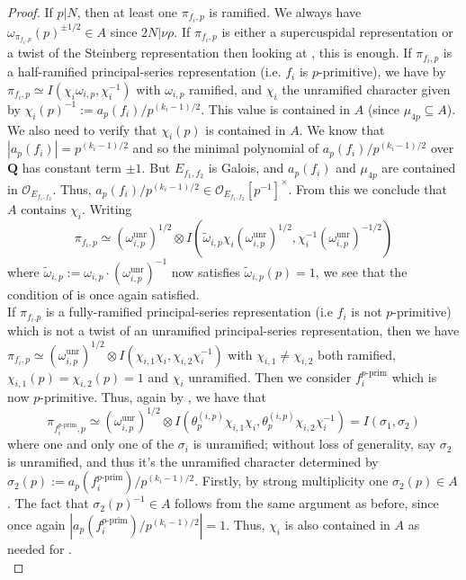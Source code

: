 \documentclass{amsart}
\theoremstyle{plain}
\theoremstyle{plain}
\theoremstyle{remark}
\begin{document}
\begin{proof}
    If $p|N$, then at least one $\pi_{f_i,p}$ is ramified. We always have $\omega_{\pi_{f_i,p}}(p)^{\pm 1/2}\in A$ since $2N|\nu\rho.$ If $\pi_{f_i,p}$ is either a supercuspidal representation or a twist of the Steinberg representation then looking at , this is enough. If $\pi_{f_i,p}$ is a half-ramified principal-series representation (i.e. $f_i$ is $p$-primitive), we have by \cite[Proposition $2.8$]{loeffler2012computation} $\pi_{f_i,p}\simeq I(\chi_{i}\omega_{i,p},\chi_{i}^{-1})$ with $\omega_{i,p}$ ramified, and $\chi_{i}$ the unramified character given by $\chi_{i}(p)^{-1}:=a_p(f_i)/p^{(k_i-1)/2}.$ This value is contained in $A$ (since $\mu_{4p}\subseteq A$). We also need to verify that $\chi_{i}(p)$ is contained in $A$. We know that $|a_p(f_i)|=p^{(k_i-1)/2}$ and so the minimal polynomial of $a_p(f_i)/p^{(k_i-1)/2}$ over $\mathbf{Q}$ has constant term $\pm 1$. But $E_{f_1,f_2}$ is Galois, and $a_p(f_i)$ and $\mu_{4p}$ are contained in $\mathcal{O}_{E_{f_1,f_2}}$. Thus, $a_p(f_i)/p^{(k_i-1)/2}\in\mathcal{O}_{E_{f_1,f_2}}[p^{-1}]^\times$. From this we conclude that $A$ contains $\chi_{i}$. Writing 
    $$\pi_{f_i,p}\simeq (\omega_{i,p}^\mathrm{unr})^{1/2}\otimes I\left(\tilde\omega_{i,p}\chi_{i} (\omega_{i,p}^\mathrm{unr})^{1/2},\chi_{i}^{-1}(\omega_{i,p}^\mathrm{unr})^{-1/2}\right)$$
    where $\tilde\omega_{i,p}:=\omega_{i,p} \cdot(\omega_{i,p}^\mathrm{unr})^{-1}$ now satisfies $\tilde\omega_{i,p}(p)=1$, we see that the condition of  is once again satisfied.\\
    If $\pi_{f_i.p}$ is a fully-ramified principal-series representation (i.e $f_i$ is not $p$-primitive) which is not a twist of an unramified principal-series representation, then we have $\pi_{f_i,p}\simeq (\omega_{i,p}^\mathrm{unr})^{1/2}\otimes I(\chi_{i,1}\chi_i,\chi_{i,2}\chi_i^{-1})$ with $\chi_{i,1}\neq\chi_{i,2}$ both ramified, $\chi_{i,1}(p)=\chi_{i,2}(p)=1$ and $\chi_i$ unramified. Then we consider $f_i^{p\text{-}\mathrm{prim}}$ which is now $p$-primitive. Thus, again by \cite[Proposition $2.8$]{loeffler2012computation}, we have that $$\pi_{f_i^{p\text{-}\mathrm{prim}},p}\simeq(\omega_{i,p}^\mathrm{unr})^{1/2}\otimes I\left(\theta_p^{(i,p)}\chi_{i,1}\chi_i,\theta_p^{(i,p)}\chi_{i,2}\chi_i^{-1}\right)= I(\sigma_1,\sigma_2)$$
    where one and only one of the $\sigma_i$ is unramified; without loss of generality, say $\sigma_2$ is unramified, and thus it's the unramified character determined by $\sigma_2(p):=a_p(f_i^{p\text{-}\mathrm{prim}})/p^{(k_i-1)/2}$. Firstly,  by strong multiplicity one $\sigma_2(p)\in A$. The fact that $\sigma_2(p)^{-1}\in A$ follows from the same argument as before, since once again $|a_p(f_i^{p\text{-}\mathrm{prim}})/p^{(k_i-1)/2}|=1$. Thus, $\chi_i$ is also contained in $A$ as needed for .\\

\end{proof}
\end{document}
